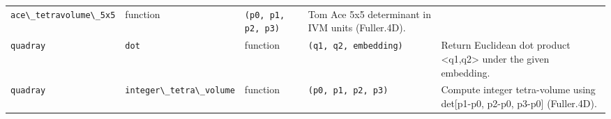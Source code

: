\documentclass[
  10pt,
]{article}
\newcommand{\passthrough}[1]{#1}
\begin{document}
\begin{longtable}[]{@{}lllll@{}}
\begin{minipage}[t]{0.17\columnwidth}
\passthrough{\lstinline!ace\_tetravolume\_5x5!}\strut
\end{minipage} & \begin{minipage}[t]{0.17\columnwidth}\raggedright
function\strut
\end{minipage} & \begin{minipage}[t]{0.17\columnwidth}\raggedright
\passthrough{\lstinline!(p0, p1, p2, p3)!}\strut
\end{minipage} & \begin{minipage}[t]{0.17\columnwidth}\raggedright
Tom Ace 5x5 determinant in IVM units (Fuller.4D).\strut
\end{minipage}\tabularnewline
\begin{minipage}[t]{0.17\columnwidth}\raggedright
\passthrough{\lstinline!quadray!}\strut
\end{minipage} & \begin{minipage}[t]{0.17\columnwidth}\raggedright
\passthrough{\lstinline!dot!}\strut
\end{minipage} & \begin{minipage}[t]{0.17\columnwidth}\raggedright
function\strut
\end{minipage} & \begin{minipage}[t]{0.17\columnwidth}\raggedright
\passthrough{\lstinline!(q1, q2, embedding)!}\strut
\end{minipage} & \begin{minipage}[t]{0.17\columnwidth}\raggedright
Return Euclidean dot product \textless q1,q2\textgreater{} under the
given embedding.\strut
\end{minipage}\tabularnewline
\begin{minipage}[t]{0.17\columnwidth}\raggedright
\passthrough{\lstinline!quadray!}\strut
\end{minipage} & \begin{minipage}[t]{0.17\columnwidth}\raggedright
\passthrough{\lstinline!integer\_tetra\_volume!}\strut
\end{minipage} & \begin{minipage}[t]{0.17\columnwidth}\raggedright
function\strut
\end{minipage} & \begin{minipage}[t]{0.17\columnwidth}\raggedright
\passthrough{\lstinline!(p0, p1, p2, p3)!}\strut
\end{minipage} & \begin{minipage}[t]{0.17\columnwidth}\raggedright
Compute integer tetra-volume using det{[}p1-p0, p2-p0, p3-p0{]}
(Fuller.4D).\strut
\end{minipage}\tabularnewline

\end{longtable}
\end{document}
